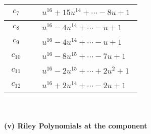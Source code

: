 \documentclass[1p]{elsarticle_modified}
\theoremstyle{definition}
\begin{document}
\begin{tabular}{m{50pt}|m{274pt}}
\hline $$\begin{aligned}c_{7}\end{aligned}$$&$\begin{aligned}
&u^{16}+15 u^{14}+\cdots-8 u+1
\end{aligned}$\\
\hline $$\begin{aligned}c_{8}\end{aligned}$$&$\begin{aligned}
&u^{16}-4 u^{14}+\cdots- u+1
\end{aligned}$\\
\hline $$\begin{aligned}c_{9}\end{aligned}$$&$\begin{aligned}
&u^{16}-4 u^{14}+\cdots- u+1
\end{aligned}$\\
\hline $$\begin{aligned}c_{10}\end{aligned}$$&$\begin{aligned}
&u^{16}-8 u^{15}+\cdots-7 u+1
\end{aligned}$\\
\hline $$\begin{aligned}c_{11}\end{aligned}$$&$\begin{aligned}
&u^{16}-2 u^{15}+\cdots+2 u^2+1
\end{aligned}$\\
\hline $$\begin{aligned}c_{12}\end{aligned}$$&$\begin{aligned}
&u^{16}+2 u^{14}+\cdots-2 u+1
\end{aligned}$\\
\hline
\end{tabular}\\~\\
\newpage\renewcommand{\arraystretch}{1}
\flushleft \textbf{(v) Riley Polynomials at the component}\newline \\
\end{document}
